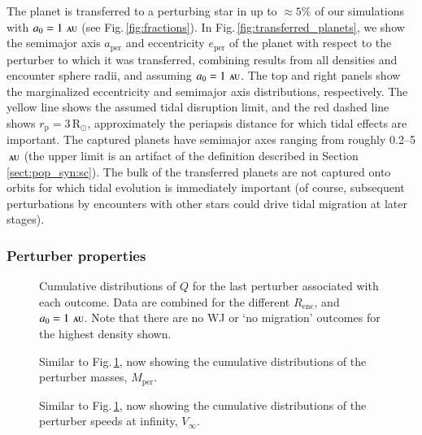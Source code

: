 \documentclass[iop,usenatbib]{emulateapj}
\renewcommand{\S}{Section}
\newcommand{\F}{Fig.}
\newcommand{\rsun}{\mathrm{R}_\odot}
\newcommand{\au}{\,\textsc{au}}
\newcommand{\renc}{R_\mathrm{enc}}
\newcommand{\mper}{M_\mathrm{per}}
\begin{document}
The planet is transferred to a perturbing star in up to $\approx 5\%$ of our simulations with $a_0=1\,\au$ (see \F\,\ref{fig:fractions}). In \F\,\ref{fig:transferred_planets}, we show the semimajor axis $a_\mathrm{per}$ and  eccentricity $e_\mathrm{per}$ of the planet with respect to the perturber to which it was transferred, combining results from all densities and encounter sphere radii, and assuming $a_0=1\,\au$. The top and right panels show the marginalized eccentricity and semimajor axis distributions, respectively. The yellow line shows the assumed tidal disruption limit, and the red dashed line shows $r_\mathrm{p} = 3 \,\rsun$, approximately the periapsis distance for which tidal effects are important. The captured planets have semimajor axes ranging from roughly 0.2--5 $\au$ (the upper limit is an artifact of the definition described in \S\,\ref{sect:pop_syn:sc}). The bulk of the transferred planets are not captured onto orbits for which tidal evolution is immediately important (of course, subsequent perturbations by encounters with other stars could drive tidal migration at later stages). 


\subsubsection{Perturber properties}
\label{sect:pop_syn:per}
\begin{figure}
\center
\iftoggle{ApJFigs}{
\texttt{[image: perturber\_Qs\_CDF\_run05.eps]}
}{
\texttt{[image: figs/perturber\_Qs\_CDF\_run05.eps]}
}
\caption { Cumulative distributions of $Q$ for the last perturber associated with each outcome. Data are combined for the different $\renc$, and $a_0=1\,\au$. Note that there are no WJ or `no migration' outcomes for the highest density shown. }
\label{fig:perturber_Qs}
\end{figure}

\begin{figure}
\center
\iftoggle{ApJFigs}{
\texttt{[image: perturber\_Ms\_CDF\_run05.eps]}
}{
\texttt{[image: figs/perturber\_Ms\_CDF\_run05.eps]}
}
\caption { Similar to \F\,\ref{fig:perturber_Qs}, now showing the cumulative distributions of the perturber masses, $\mper$. }
\label{fig:perturber_Ms}
\end{figure}

\begin{figure}
\center
\iftoggle{ApJFigs}{
\texttt{[image: perturber\_V\_inftys\_CDF\_run05.eps]}
}{
\texttt{[image: figs/perturber\_V\_inftys\_CDF\_run05.eps]}
}
\caption { Similar to \F\,\ref{fig:perturber_Qs}, now showing the cumulative distributions of the perturber speeds at infinity, $V_\infty$.}
\label{fig:perturber_V_inftys}
\end{figure}
\end{document}
